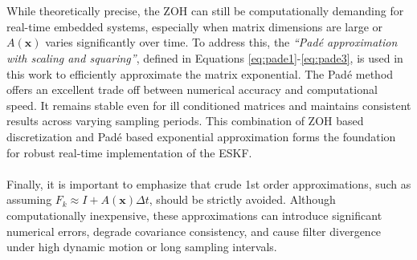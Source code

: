 \\ \\
While theoretically precise, the ZOH can still be computationally demanding for real-time embedded systems, especially when matrix dimensions are large or $A(\mathbf{x})$ varies significantly over time. To address this, the \textit{``Padé approximation with scaling and squaring''}, defined in Equations \ref{eq:pade1}-\ref{eq:pade3}, is used in this work to efficiently approximate the matrix exponential. The Padé method offers an excellent trade off between numerical accuracy and computational speed. It remains stable even for ill conditioned matrices and maintains consistent results across varying sampling periods. This combination of ZOH based discretization and Padé based exponential approximation forms the foundation for robust real-time implementation of the ESKF.  
\\ \\
Finally, it is important to emphasize that crude 1st order approximations, such as assuming $F_k \approx I + A(\mathbf{x})\Delta t$, should be strictly avoided. Although computationally inexpensive, these approximations can introduce significant numerical errors, degrade covariance consistency, and cause filter divergence under high dynamic motion or long sampling intervals.



